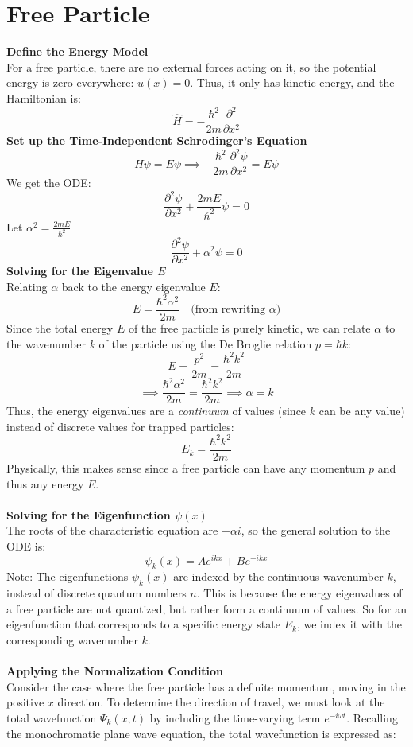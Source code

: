\documentclass[12pt]{article}
\begin{document}
\section*{Free Particle}
\textbf{Define the Energy Model}\\
For a free particle, there are no external forces acting on it, so the potential energy is zero everywhere: $u(x)=0$. Thus, it only has kinetic energy, and the Hamiltonian is:
\[\hat{H} = -\frac{\hbar^2}{2m} \frac{\partial^2}{\partial x^2}\]
\textbf{Set up the Time-Independent Schrodinger's Equation}\\
\[\hat{H}\psi = E \psi \implies -\frac{\hbar^2}{2m} \frac{\partial^2 \psi}{\partial x^2} = E \psi\]
We get the ODE:
\[\frac{\partial^2 \psi}{\partial x^2} + \frac{2mE}{\hbar^2} \psi = 0\]
Let $\alpha^2 = \frac{2mE}{\hbar^2}$
\[\frac{\partial^2 \psi}{\partial x^2} + \alpha^2 \psi = 0\]
\textbf{Solving for the Eigenvalue $E$}\\
Relating $\alpha$ back to the energy eigenvalue $E$:
\[E = \frac{\hbar^2 \alpha^2}{2m}\quad \text{(from rewriting $\alpha$)}\]
Since the total energy $E$ of the free particle is purely kinetic, we can relate $\alpha$ to the wavenumber $k$ of the particle using the De Broglie relation $p = \hbar k$:
\[E = \frac{p^2}{2m} = \frac{\hbar^2 k^2}{2m}\]
\[\implies \frac{\hbar^2 \alpha^2}{2m} = \frac{\hbar^2 k^2}{2m}\implies \boxed{\alpha = k}\]
Thus, the energy eigenvalues are a \textit{continuum} of values (since $k$ can be any value) instead of discrete values for trapped particles:
\[\boxed{E_k = \frac{\hbar^2 k^2}{2m}}\]
Physically, this makes sense since a free particle can have any momentum $p$ and thus any energy $E$.\\\\
\textbf{Solving for the Eigenfunction $\psi(x)$}\\
The roots of the characteristic equation are $\pm \alpha i$, so the general solution to the ODE is:
\[\psi_k(x) = A e^{ik x} + B e^{-i kx}\]
\underline{Note:} The eigenfunctions $\psi_k(x)$ are indexed by the continuous wavenumber $k$, instead of discrete quantum numbers $n$. This is because the energy eigenvalues of a free particle are not quantized, but rather form a continuum of values. So for an eigenfunction that corresponds to a specific energy state $E_k$, we index it with the corresponding wavenumber $k$.\\\\
\textbf{Applying the Normalization Condition}\\
Consider the case where the free particle has a definite momentum, moving in the positive $x$ direction. To determine the direction of travel, we must look at the total wavefunction $\Psi_k(x,t)$ by including the time-varying term $e^{-i\omega t}$.  Recalling the monochromatic plane wave equation, the total wavefunction is expressed as:
\end{document}
